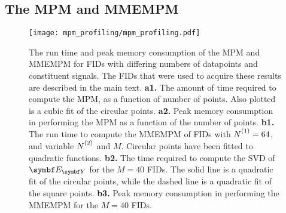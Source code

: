 \subsection{The \acs{MPM} and \acs{MMEMPM}}
\label{subsec:mpm-profiling}
\begin{figure}
    \centering
    \texttt{[image: mpm\_profiling/mpm\_profiling.pdf]}
    \caption[
        The run time and peak memory consumption of
        the \acs{MPM} and \acs{MMEMPM}
        for \acsp{FID} with differing numbers of
        datapoints and constituent signals.
    ]
    {
        The run time and peak memory consumption of
        the \acs{MPM} and \acs{MMEMPM}
        for \acsp{FID} with differing numbers of
        datapoints and constituent signals.
        The \acp{FID} that were used to acquire these results are described in
        the main text.
        \textbf{a1.} The amount of time required to compute the \ac{MPM}, as a
        function of number of points. Also plotted is a cubic fit of the
        circular points.
        \textbf{a2.} Peak memory consumption in performing the \ac{MPM} as a
        function of the number of points.
        \textbf{b1.} The run time to compute the \ac{MMEMPM} of
        \acp{FID} with $\None = 64$, and variable $\Ntwo$ and $M$. Circular
        points have been fitted to quadratic functions.
        \textbf{b2.} The time required to compute the \ac{SVD} of $\EY$ for the
        $M=40$ \acp{FID}. The solid line is a quadratic fit of the circular
        points, while the dashed line is a quadratic fit of the square points.
        \textbf{b3.} Peak memory consumption in performing the \ac{MMEMPM} for
        the $M=40$ \acp{FID}.
    }
    \label{fig:mpm-profiling}
\end{figure}

